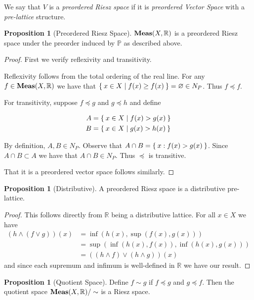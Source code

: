 \documentclass[letterpaper,10pt,oneside,onecolumn,reqno]{amsart}
\renewcommand{\P}{\mathbb P}
\newcommand{\R}{\mathbb R}
\theoremstyle{definition}
\newtheorem{pro}[thm]{Proposition}
\newcommand{\catname}[1]{{\normalfont\textbf{#1}}}
\newcommand{\Meas}{\catname{Meas}}
\newcommand{\meet}{\wedge}
\newcommand{\join}{\vee}
\begin{document}
We say that $V$ is a \emph{preordered
  Riesz space} if it is \emph{preordered Vector Space} with a
\emph{pre-lattice} structure.

\begin{pro}[Preordered Riesz Space]\label{pro:1}
  $\Meas(X, \R)$ is a preordered Riesz space under the preorder
  induced by $\P$ as described above.
\end{pro}

\begin{proof}
  First we verify reflexivity and transitivity.

  Reflexivity follows from the total ordering of the real line. For
  any $f \in \Meas(X, \R)$ we have that $\Set{x \in X | f(x) \geq
    f(x)} = \varnothing \in N_P$. Thus $f \preceq f$.

  For transitivity, suppose $f \preceq g$ and $g \preceq h$ and define

\begin{align*}
  A &= \Set{x \in X | f(x) > g(x)} \\
  B &= \Set{x \in X | g(x) > h(x)}
\end{align*}

By definition, $A,B \in N_P$. Observe that $A \cap B = \Set{x : f(x) >
  g(x)}$. Since $A \cap B \subset A$ we have that $A \cap B \in
N_P$. Thus $\preceq $ is transitive.

That it is a preordered vector space follows similarly.

\end{proof}

\begin{pro}[Distributive]\label{pro:2}
  A preordered Riesz space is a distributive pre-lattice.
\end{pro}

\begin{proof}
  This follows directly from $\R$ being a distributive lattice. For
  all $x \in X$ we have
  \begin{align*}
    (h \meet (f \join g))(x) &= \inf(h(x), \sup(f(x),g(x))) \\
    &= \sup(\inf(h(x),f(x)),\inf(h(x),g(x))) \\
    &= ((h \meet f) \join (h \meet g))(x)
  \end{align*}
  and since each supremum and infimum is well-defined in $\R$ we have
  our result.
\end{proof}

\begin{pro}[Quotient Space]\label{pro:3}
  Define $f \sim g$ if $f \preceq g$ and $g \preceq f$. Then the
  quotient space $\Meas(X,\R)/\sim$ is a Riesz space.
\end{pro}
\end{document}

